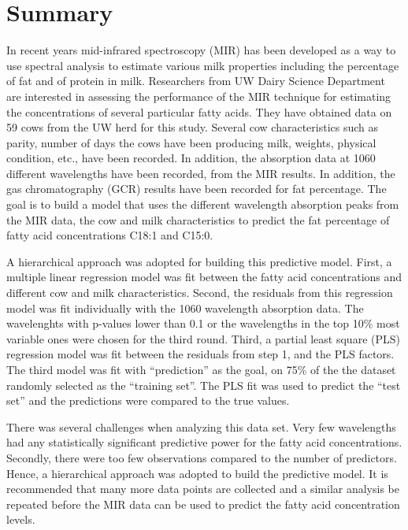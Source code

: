 \section*{Summary}\label{Sec_Summary}
In recent years mid-infrared spectroscopy (MIR) has been developed as a way to use spectral analysis to estimate various milk properties including the percentage of fat and of protein in milk. Researchers from UW Dairy Science Department are interested in assessing the performance of the MIR technique for estimating the concentrations of several particular fatty acids. They have obtained data on 59 cows from the UW herd for this study. Several cow characteristics such as parity, number of days the cows have been producing milk, weights, physical condition, etc., have been recorded. In addition, the absorption data at 1060 different wavelengths have been recorded, from the MIR results. In addition, the gas chromatography (GCR) results have been recorded for fat percentage. The goal is to build a model that uses the different wavelength absorption peaks from the MIR data, the cow and milk characteristics to predict the fat percentage of fatty acid concentrations C18:1 and C15:0. 

A hierarchical approach was adopted for building this predictive model. First, a multiple linear regression model was fit between the fatty acid concentrations and different cow and milk characteristics. Second, the residuals from this regression model was fit individually with the 1060 wavelength absorption data. The wavelenghts with p-values lower than 0.1 or the wavelengths in the top 10\% most variable ones were chosen for the third round. Third, a partial least square (PLS) regression model was fit between the residuals from step 1, and the PLS factors. The third model was fit with ``prediction'' as the goal, on 75\% of the the dataset randomly selected as the ``training set''. The PLS fit was used to predict the ``test set'' and the predictions were compared to the true values.

There was several challenges when analyzing this data set. Very few wavelengths had any statistically significant predictive power for the fatty acid concentrations. Secondly, there were too few observations compared to the number of predictors. Hence, a hierarchical approach was adopted to build the predictive model. It is recommended that many more data points are collected and a similar analysis be repeated before the MIR data can be used to predict the fatty acid concentration levels. 



